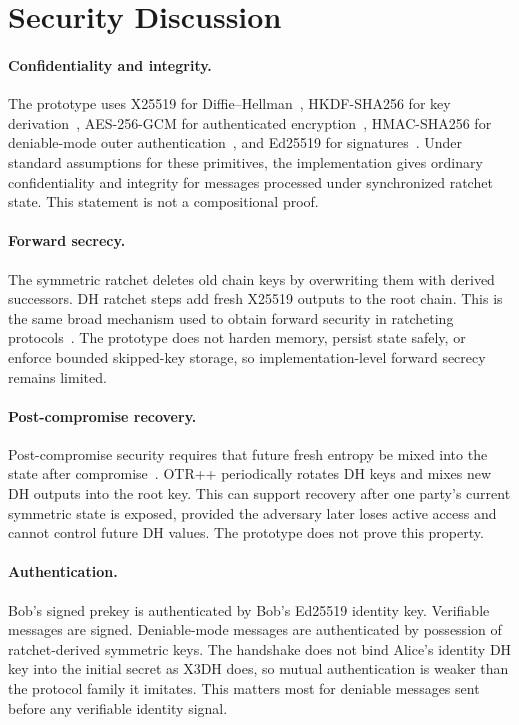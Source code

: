 \documentclass[11pt]{article}
\newcommand{\prot}{OTR++}
\begin{document}
\section{Security Discussion}

\paragraph{Confidentiality and integrity.}
The prototype uses X25519 for Diffie--Hellman~\cite{rfc7748}, HKDF-SHA256 for key derivation~\cite{rfc5869}, AES-256-GCM for authenticated encryption~\cite{nist_fips197,nist_sp800_38d}, HMAC-SHA256 for deniable-mode outer authentication~\cite{rfc2104}, and Ed25519 for signatures~\cite{rfc8032}. Under standard assumptions for these primitives, the implementation gives ordinary confidentiality and integrity for messages processed under synchronized ratchet state. This statement is not a compositional proof.

\paragraph{Forward secrecy.}
The symmetric ratchet deletes old chain keys by overwriting them with derived successors. DH ratchet steps add fresh X25519 outputs to the root chain. This is the same broad mechanism used to obtain forward security in ratcheting protocols~\cite{signal_doubleratchet,alwen2019doubleratchet}. The prototype does not harden memory, persist state safely, or enforce bounded skipped-key storage, so implementation-level forward secrecy remains limited.

\paragraph{Post-compromise recovery.}
Post-compromise security requires that future fresh entropy be mixed into the state after compromise~\cite{cohngordon2016pcs}. \prot{} periodically rotates DH keys and mixes new DH outputs into the root key. This can support recovery after one party's current symmetric state is exposed, provided the adversary later loses active access and cannot control future DH values. The prototype does not prove this property.

\paragraph{Authentication.}
Bob's signed prekey is authenticated by Bob's Ed25519 identity key. Verifiable messages are signed. Deniable-mode messages are authenticated by possession of ratchet-derived symmetric keys. The handshake does not bind Alice's identity DH key into the initial secret as X3DH does, so mutual authentication is weaker than the protocol family it imitates. This matters most for deniable messages sent before any verifiable identity signal.
\end{document}
